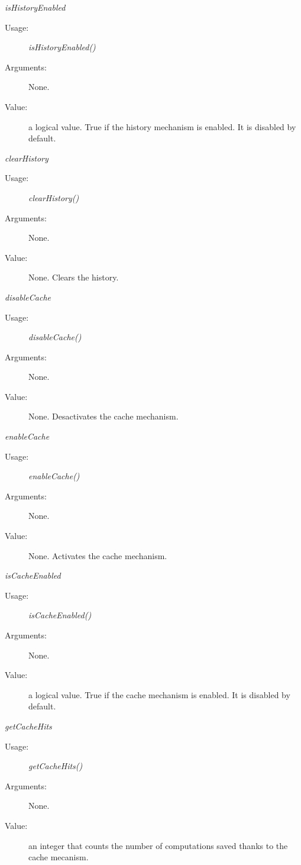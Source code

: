 \begin{description}
\begin{description}
\item \textit{isHistoryEnabled}
\begin{description}
\item[Usage:] \textit{isHistoryEnabled()}
\item[Arguments:] None.
\item[Value:] a logical value. True if the history mechanism is enabled. It is disabled by default.
\end{description}
\bigskip

\item \textit{clearHistory}
\begin{description}
\item[Usage:] \textit{clearHistory()}
\item[Arguments:] None.
\item[Value:] None. Clears the history.
\end{description}
\bigskip

\item \textit{disableCache}
\begin{description}
\item[Usage:] \textit{disableCache()}
\item[Arguments:] None.
\item[Value:] None. Desactivates the cache mechanism.
\end{description}
\bigskip

\item \textit{enableCache}
\begin{description}
\item[Usage:] \textit{enableCache()}
\item[Arguments:] None.
\item[Value:] None. Activates the cache mechanism.
\end{description}
\bigskip

\item \textit{isCacheEnabled}
\begin{description}
\item[Usage:] \textit{isCacheEnabled()}
\item[Arguments:] None.
\item[Value:] a logical value. True if the cache mechanism is enabled. It is disabled by default.
\end{description}
\bigskip

\item \textit{getCacheHits}
\begin{description}
\item[Usage:] \textit{getCacheHits()}
\item[Arguments:] None.
\item[Value:] an integer that counts the number of computations saved thanks to the cache mecanism.
\end{description}
\bigskip


\end{description}
\end{description}
